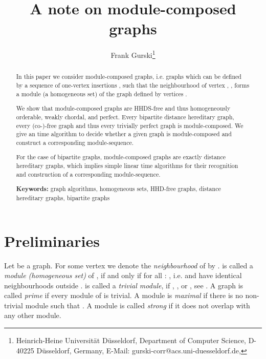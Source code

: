 \documentclass[11pt]{article}
\begin{document}
\title{A note on module-composed graphs}

\author{Frank Gurski\thanks{Heinrich-Heine Universit\"at D\"usseldorf,
Department of Computer Science, D-40225 D\"usseldorf, Germany,
E-Mail: gurski-corr@acs.uni-duesseldorf.de, }}



\bigskip

\maketitle

\begin{abstract}
In this paper we consider module-composed graphs, i.e. graphs which can be defined by a sequence of one-vertex insertions , such
that the neighbourhood of vertex , , forms a module (a homogeneous set) of the graph defined by vertices .

We show that
module-composed graphs are HHDS-free and thus homogeneously orderable, weakly chordal, and perfect. Every bipartite distance hereditary graph, every (co-)-free graph and thus every trivially perfect graph is module-composed. We give an  time algorithm to decide whether a given graph  is module-composed and construct a corresponding 
module-sequence.

For the case of bipartite graphs, module-composed graphs
are exactly distance hereditary graphs, which implies
simple linear time algorithms for their recognition and construction of a corresponding module-sequence.

\bigskip
\noindent
{\bf Keywords:} graph algorithms, homogeneous sets, HHD-free graphs, distance hereditary graphs, bipartite graphs
\end{abstract}








\section{Preliminaries}




Let  be a graph.
For some vertex  we denote the {\em neighbourhood} of  by
.  is called a {\em module (homogeneous set)} of , if
and only if for all : , i.e.  and  have
identical neighbourhoods outside .  is called a {\em trivial module},
if ,  , or , see \cite{CH94}. A graph  is called {\em prime}
if every module of  is trivial.
A module  is {\em maximal} if there is no non-trivial module  such that .
A module is called {\em strong} if it does not overlap
with any other module. 
\end{document}
